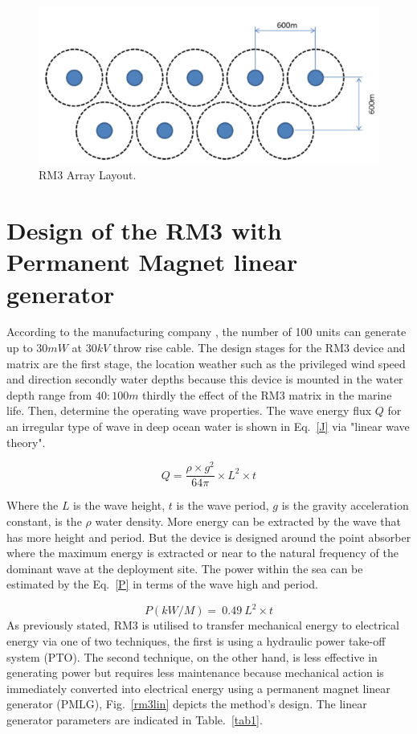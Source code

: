 \documentclass[conference]{IEEEtran}
\begin{document}
\begin{figure}[htbp]
	\centerline{\includegraphics[width=2 in]{fig/3.png}}
	\caption{RM3 Array Layout\cite{neary2014methodology}.}
	\label{rm3arr}
\end{figure}
\section{Design of the RM3 with Permanent Magnet linear generator}
According to the manufacturing company \cite{neary2014methodology}, the number of 100 units can generate up to $30 mW$ at $30 kV$ throw rise cable. The design stages for the RM3 device and matrix are the first stage, the location weather such as the privileged wind speed and direction secondly water depths because this device is mounted in the water depth range from $40:100 m$ thirdly the effect of the RM3 matrix in the marine life. Then, determine the operating wave properties. The wave energy flux $Q$ for an irregular type of wave in deep ocean water is shown in Eq.~\ref{J} via "linear wave theory"\cite{reviewofwaveenergy}.

\begin{equation}
Q=\dfrac{\rho \times g^2}{64\pi} \times L^2 \times t\label{J}
\end{equation}


Where the $L$ is the wave height, $t$ is the wave period, $g$ is the gravity acceleration constant, is the $\rho$ water density. More energy can be extracted by the wave that has more height and period. But the device is designed around the point absorber where the maximum energy is extracted or near to the natural frequency of the dominant wave at the deployment site. The power within the sea can be estimated by the Eq.~\ref{P} in terms of the wave high and period.


\begin{equation}
	P(kW/M)=\ 0.49\ L^2 \times t\label{P}
\end{equation}
As previously stated, RM3 is utilised to transfer mechanical energy to electrical energy via one of two techniques, the first is using a hydraulic power take-off system (PTO). The second technique, on the other hand, is less effective in generating power but requires less maintenance because mechanical action is immediately converted into electrical energy using a permanent magnet linear generator (PMLG), Fig.~\ref{rm3lin} depicts the method's design. The linear generator parameters are indicated in Table.~\ref{tab1}.
\end{document}
